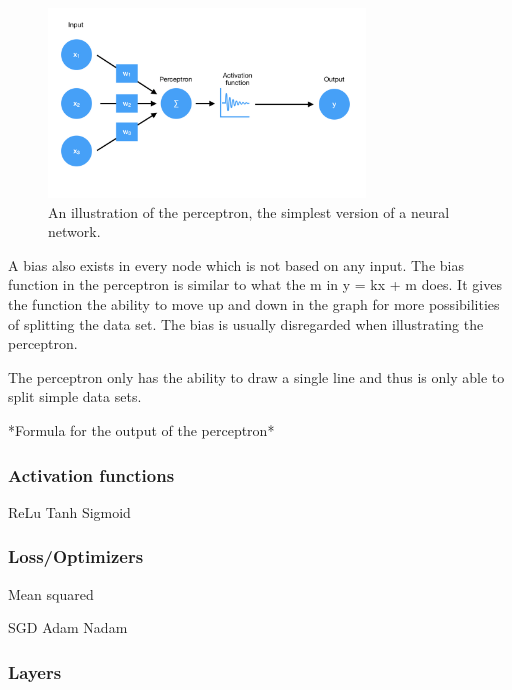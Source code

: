 \begin{figure}[hbtp]
\begin{center}
\includegraphics[width = 0.75\textwidth]{./Images/perceptron.jpg} 
\caption{An illustration of the perceptron, the simplest version of a neural network.}
\end{center}
\end{figure}

A bias also exists in every node which is not based on any input. The bias function in the perceptron is similar to what the m in y = kx + m does. It gives the function the ability to move up and down in the graph for more possibilities of splitting the data set. The bias is usually disregarded when illustrating the perceptron.

The perceptron only has the ability to draw a single line and thus is only able to split simple data sets.

*Formula for the output of the perceptron*

\subsubsection{Activation functions}

ReLu
Tanh
Sigmoid

\subsubsection{Loss/Optimizers}

Mean squared

SGD
Adam
Nadam

\subsubsection{Layers}

